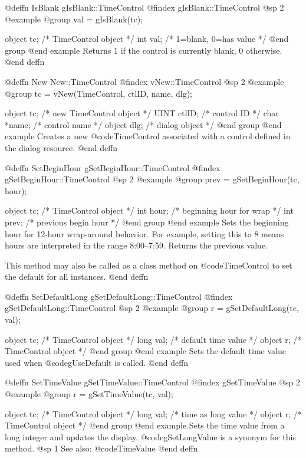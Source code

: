 @deffn {IsBlank} gIsBlank::TimeControl
@findex gIsBlank::TimeControl
@sp 2
@example
@group
val = gIsBlank(tc);

object  tc;    /*  TimeControl object     */
int     val;   /*  1=blank, 0=has value   */
@end group
@end example
Returns 1 if the control is currently blank, 0 otherwise.
@end deffn



@deffn {New} New::TimeControl
@findex vNew::TimeControl
@sp 2
@example
@group
tc = vNew(TimeControl, ctlID, name, dlg);

object  tc;       /*  new TimeControl object  */
UINT    ctlID;    /*  control ID              */
char    *name;    /*  control name            */
object  dlg;      /*  dialog object           */
@end group
@end example
Creates a new @code{TimeControl} associated with a control defined in
the dialog resource.
@end deffn



@deffn {SetBeginHour} gSetBeginHour::TimeControl
@findex gSetBeginHour::TimeControl
@sp 2
@example
@group
prev = gSetBeginHour(tc, hour);

object  tc;     /*  TimeControl object        */
int     hour;   /*  beginning hour for wrap   */
int     prev;   /*  previous begin hour       */
@end group
@end example
Sets the beginning hour for 12-hour wrap-around behavior.  For example,
setting this to 8 means hours are interpreted in the range 8:00--7:59.
Returns the previous value.

This method may also be called as a class method on @code{TimeControl}
to set the default for all instances.
@end deffn



@deffn {SetDefaultLong} gSetDefaultLong::TimeControl
@findex gSetDefaultLong::TimeControl
@sp 2
@example
@group
r = gSetDefaultLong(tc, val);

object  tc;    /*  TimeControl object  */
long    val;   /*  default time value  */
object  r;     /*  TimeControl object  */
@end group
@end example
Sets the default time value used when @code{gUseDefault} is called.
@end deffn



@deffn {SetTimeValue} gSetTimeValue::TimeControl
@findex gSetTimeValue
@sp 2
@example
@group
r = gSetTimeValue(tc, val);

object  tc;    /*  TimeControl object  */
long    val;   /*  time as long value  */
object  r;     /*  TimeControl object  */
@end group
@end example
Sets the time value from a long integer and updates the display.
@code{gSetLongValue} is a synonym for this method.
@sp 1
See also:  @code{TimeValue}
@end deffn



